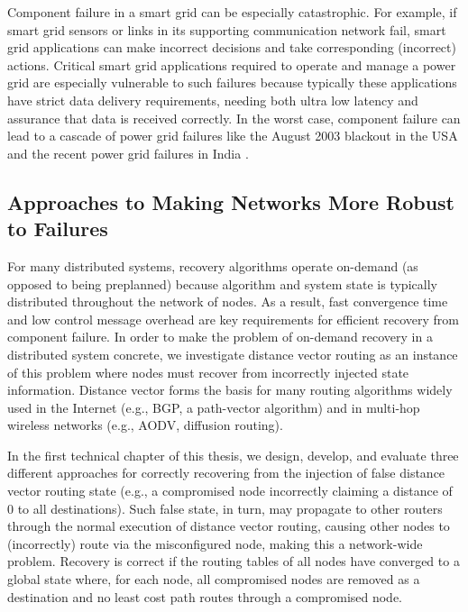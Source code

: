 Component failure in a smart grid can be especially catastrophic.
For example, if smart grid sensors or links in its supporting communication network fail, smart grid applications can make incorrect decisions and take corresponding (incorrect) actions. 
Critical smart grid applications required to operate and manage a power grid are especially vulnerable to such failures because typically these applications have strict data delivery requirements,
needing both ultra low latency and assurance that data is received correctly. 
In the worst case, component failure can lead to a cascade of power grid failures like the August 2003 blackout in the USA \cite{2003Blackout} and the 
recent power grid failures in India \cite{IndiaBlackout}.






\subsection{Approaches to Making Networks More Robust to Failures}



For many distributed systems, recovery algorithms operate on-demand (as opposed to being preplanned) because algorithm and system state is typically distributed throughout the network of nodes.  
As a result, fast convergence time and low control message overhead are key requirements for efficient recovery from component failure. 
In order to make the problem of on-demand recovery in a distributed system concrete, we investigate distance vector routing as an instance of this problem where nodes must recover
from incorrectly injected state information.
Distance vector forms the basis for many routing algorithms widely used in the Internet (e.g., BGP, a path-vector algorithm) and in multi-hop wireless networks (e.g., AODV, diffusion routing).

In the first technical chapter of this thesis, we design, develop, and evaluate three different approaches for correctly recovering from the injection of false distance vector routing state (e.g., a compromised node incorrectly
claiming a distance of $0$ to all destinations). Such false state, in turn, may propagate to other routers through the normal execution of distance vector routing, causing other nodes to (incorrectly) route via the misconfigured node, making this a network-wide problem.
Recovery is correct if the routing tables of all nodes have converged to a global state where, for each node, all compromised nodes are removed as a destination and
no least cost path routes through a compromised node.  

